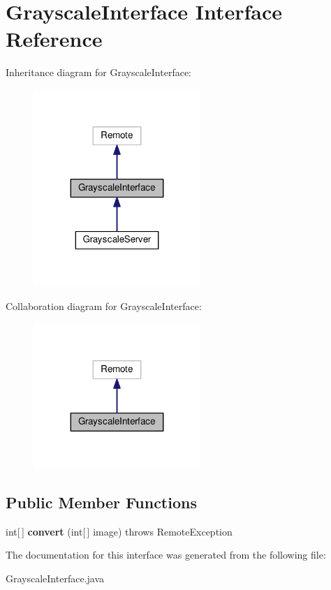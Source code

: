\hypertarget{interfaceGrayscaleInterface}{}\section{Grayscale\+Interface Interface Reference}
\label{interfaceGrayscaleInterface}


Inheritance diagram for Grayscale\+Interface\+:
\nopagebreak
\begin{figure}[H]
\begin{center}
\leavevmode
\includegraphics[width=179pt]{interfaceGrayscaleInterface__inherit__graph}
\end{center}
\end{figure}


Collaboration diagram for Grayscale\+Interface\+:
\nopagebreak
\begin{figure}[H]
\begin{center}
\leavevmode
\includegraphics[width=179pt]{interfaceGrayscaleInterface__coll__graph}
\end{center}
\end{figure}
\subsection*{Public Member Functions}
\begin{DoxyCompactItemize}
\item 
int\mbox{[}$\,$\mbox{]} {\bfseries convert} (int\mbox{[}$\,$\mbox{]} image)  throws Remote\+Exception	\hypertarget{interfaceGrayscaleInterface_aff44e0d3dc8bba6abfff41782864b373}{}\label{interfaceGrayscaleInterface_aff44e0d3dc8bba6abfff41782864b373}

\end{DoxyCompactItemize}


The documentation for this interface was generated from the following file\+:\begin{DoxyCompactItemize}
\item 
Grayscale\+Interface.\+java\end{DoxyCompactItemize}
